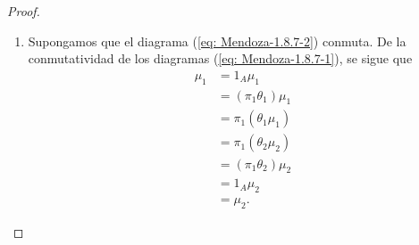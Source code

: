 \documentclass[tesis]{subfiles}
\begin{document}
\begin{proof}\leavevmode

    \begin{enumerate}[label=(\alph*)]
    
        \item Supongamos que el diagrama (\ref{eq: Mendoza-1.8.7-2}) conmuta. De la conmutatividad de los diagramas (\ref{eq: Mendoza-1.8.7-1}), se sigue que
            \begin{align*}
                \mu_1 &= 1_A\mu_1 \\
                      &= (\pi_1\theta_1)\mu_1 \\
                      &= \pi_1(\theta_1\mu_1) \\
                      &= \pi_1(\theta_2\mu_2) \\
                      &= (\pi_1\theta_2)\mu_2 \\
                      &= 1_A\mu_2 \\
                      &= \mu_2.
            \end{align*}


\end{enumerate}
\end{proof}
\end{document}
